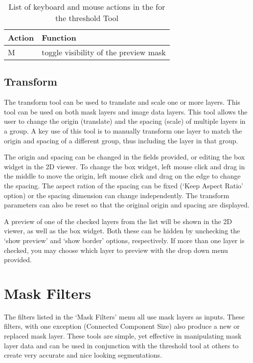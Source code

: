 \documentclass[fleqn,11pt,openany]{book}
\begin{document}
\begin{table}[h!]
\label{tab:thresholdkey}
\caption{List of keyboard and mouse actions in the for the threshold Tool}
\begin{tabular}{|l|l|}
\hline
{\bf Action} & {\bf Function}\\
\hline 
M & toggle visibility of the preview mask\\
\hline
\end{tabular}
\end{table}

\subsection{Transform}

The transform tool can be used to translate and scale one or more layers.  This tool can be used on both mask layers and image data layers.  This tool allows the user to change the origin (translate) and the spacing (scale) of multiple layers in a group.  A key use of this tool is to manually transform one layer to match the origin and spacing of a different group, thus including the layer in that group. 

The origin and spacing can be changed in the fields provided, or editing the box widget in the 2D viewer.  To change the box widget, left mouse click and drag in the middle to move the origin, left mouse click and drag on the edge to change the spacing.  The aspect ration of the spacing can be fixed (`Keep Aspect Ratio' option) or the spacing dimension can change independently.  The transform parameters can also be reset so that the original origin and spacing are displayed.  

A preview of one of the checked layers from the list will be shown in the 2D viewer, as well as the box widget.  Both these can be hidden by unchecking the `show preview' and `show border' options, respectively.  If more than one layer is checked, you may choose which layer to preview with the drop down menu provided.  

\section{Mask Filters}

The filters listed in the `Mask Filters' menu all use mask layers as inputs.  These filters, with one exception (Connected Component Size) also produce a new or replaced mask layer.  These tools are simple, yet effective in manipulating mask layer data and can be used in conjunction with the threshold tool at others to create very accurate and nice looking segmentations.
\end{document}
